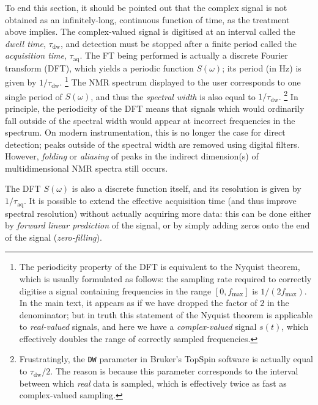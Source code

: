 To end this section, it should be pointed out that the complex signal is not obtained as an infinitely-long, continuous function of time, as the treatment above implies.
The complex-valued signal is digitised at an interval called the \textit{dwell time}, $\tau_\text{dw}$, and detection must be stopped after a finite period called the \textit{acquisition time}, $\tau_\text{aq}$.
The FT being performed is actually a discrete Fourier transform (DFT), which yields a periodic function $S(\omega)$; its period (in Hz) is given by $1/\tau_\text{dw}$.%
\footnote{The periodicity property of the DFT is equivalent to the Nyquist theorem, which is usually formulated as follows: the sampling rate required to correctly digitise a signal containing frequencies in the range $[0, f_\text{max}]$ is $1/(2f_\text{max})$. In the main text, it appears as if we have dropped the factor of $2$ in the denominator; but in truth this statement of the Nyquist theorem is applicable to \textit{real-valued} signals, and here we have a \textit{complex-valued} signal $s(t)$, which effectively doubles the range of correctly sampled frequencies.}
The NMR spectrum displayed to the user corresponds to one single period of $S(\omega)$, and thus the \textit{spectral width} is also equal to $1/\tau_\text{dw}$.%
\footnote{Frustratingly, the \texttt{DW} parameter in Bruker's TopSpin software is actually equal to $\tau_\text{dw}/2$. The reason is because this parameter corresponds to the interval between which \textit{real} data is sampled, which is effectively twice as fast as complex-valued sampling.}
In principle, the periodicity of the DFT means that signals which would ordinarily fall outside of the spectral width would appear at incorrect frequencies in the spectrum.\autocite{Turner1986JMR}
On modern instrumentation, this is no longer the case for direct detection; peaks outside of the spectral width are removed using digital filters.
However, \textit{folding} or \textit{aliasing} of peaks in the indirect dimension(s) of multidimensional NMR spectra still occurs.

The DFT $S(\omega)$ is also a discrete function itself, and its resolution is given by $1/\tau_\text{aq}$.
It is possible to extend the effective acquisition time (and thus improve spectral resolution) without actually acquiring more data: this can be done either by \textit{forward linear prediction} of the signal, or by simply adding zeros onto the end of the signal (\textit{zero-filling}).
